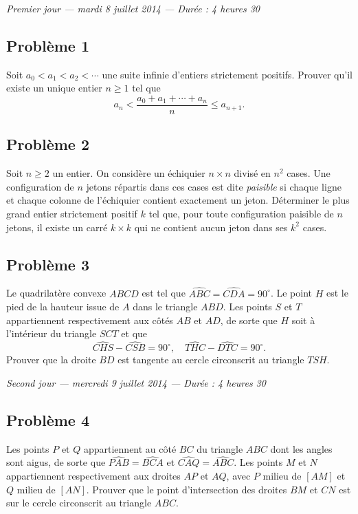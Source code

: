 
\begin{center}
  \emph{Premier jour --- mardi 8 juillet 2014 --- Durée : 4 heures 30}
\end{center}

\subsection*{Problème 1}
Soit $a_0 < a_1 < a_2 < \cdots$ une suite infinie d'entiers strictement positifs. Prouver qu'il existe un
unique entier $n \geq 1$ tel que
\[
a_n < \frac{a_0 + a_1 + \cdots + a_n}{n} \leq a_{n+1}.
\]

\subsection*{Problème 2}
Soit $n \geq 2$ un entier. On considère un échiquier $n \times n$ divisé en $n^2$ cases. Une configuration de
$n$ jetons répartis dans ces cases est dite \emph{paisible} si chaque ligne et chaque colonne de l'échiquier
contient exactement un jeton. Déterminer le plus grand entier strictement positif $k$ tel que, pour toute
configuration paisible de $n$ jetons, il existe un carré $k \times k$ qui ne contient aucun jeton dans ses
$k^2$ cases.

\subsection*{Problème 3}
Le quadrilatère convexe $ABCD$ est tel que $\widehat{ABC} = \widehat{CDA} = 90^\circ$. Le point $H$ est le pied
de la hauteur issue de $A$ dans le triangle $ABD$. Les points $S$ et $T$ appartiennent respectivement aux côtés
$AB$ et $AD$, de sorte que $H$ soit à l'intérieur du triangle $SCT$ et que
\[
\widehat{CHS} - \widehat{CSB} = 90^\circ, \quad \widehat{THC} - \widehat{DTC} = 90^\circ.
\]
Prouver que la droite $BD$ est tangente au cercle circonscrit au triangle $TSH$.

\bigskip
\begin{center}
  \emph{Second jour --- mercredi 9 juillet 2014 --- Durée : 4 heures 30}
\end{center}

\subsection*{Problème 4}
Les points $P$ et $Q$ appartiennent au côté $BC$ du triangle $ABC$ dont les angles sont aigus, de sorte que
$\widehat{PAB} = \widehat{BCA}$ et $\widehat{CAQ} = \widehat{ABC}$. Les points $M$ et $N$ appartiennent
respectivement aux droites $AP$ et $AQ$, avec $P$ milieu de $[AM]$ et $Q$ milieu de $[AN]$. Prouver que le
point d'intersection des droites $BM$ et $CN$ est sur le cercle circonscrit au triangle $ABC$.

